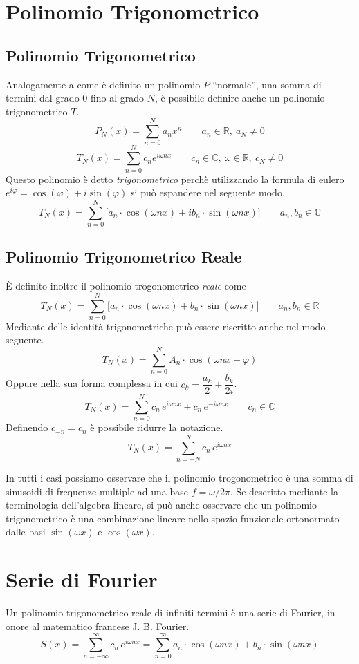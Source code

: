 \section{Polinomio Trigonometrico}
\subsection{Polinomio Trigonometrico}
Analogamente a come \`e definito un polinomio \(P\) ``normale'', una somma di
termini dal grado 0 fino al grado \(N\), \`e possibile definire anche un
polinomio trigonometrico \(T\).
\[
    P_N(x) = \sum_{n=0}^N a_n x^n \qquad a_n \in \mathbb{R},~ a_N \neq 0
\]
\[
    T_N(x) = \sum_{n=0}^N c_n e^{i\omega nx} 
        \qquad c_n \in\mathbb{C},~\omega\in\mathbb{R}, ~ c_N \neq 0
\]
Questo polinomio \`e detto \emph{trigonometrico} perch\`e utilizzando la
formula di eulero \(e^{i\varphi} = \cos(\varphi) + i\sin(\varphi)\) si pu\`o
espandere nel seguente modo.
\[
    T_N(x) = \sum_{n=0}^N\big [a_n\cdot\cos(\omega nx) + ib_n\cdot\sin(\omega nx)]
    \qquad a_n, b_n \in \mathbb{C}
\]

\subsection{Polinomio Trigonometrico Reale} \label{sec:real-trig}
\`E definito inoltre il polinomio trogonometrico \emph{reale} come
\[
    T_N(x) = \sum_{n=0}^N\big [a_n\cdot\cos(\omega nx) + b_n\cdot\sin(\omega nx)]
    \qquad a_n, b_n \in \mathbb{R}
\]
Mediante delle identit\`a trigonometriche pu\`o essere riscritto anche nel
modo seguente.
\[
    T_N(x) = \sum_{n=0}^N A_n\cdot\cos(\omega nx - \varphi)
\]
Oppure nella sua forma complessa in cui \(c_k = \dfrac{a_k}{2} + \dfrac{b_k}{2i}\).
\[
    T_N(x) = \sum_{n=0}^N c_n\,e^{i\omega nx} + \bar{c_n}\,e^{-i\omega nx}
    \qquad c_n \in \mathbb{C}
\]
Definendo \(c_{-n} = \bar{c_n}\) \`e possibile ridurre la notazione.
\[
    T_N(x) = \sum_{n=-N}^N c_n\,e^{i\omega nx}
\]

In tutti i casi possiamo osservare che il polinomio trogonometrico \`e una
somma di sinusoidi di frequenze multiple ad una base \(f = \omega/2\pi\).  Se
descritto mediante la terminologia dell'algebra lineare, si pu\`o anche
osservare che un polinomio trigonometrico \`e una combinazione lineare nello
spazio funzionale ortonormato dalle basi \(\sin(\omega x)\) e \(\cos(\omega
x)\).


\section{Serie di Fourier}
Un polinomio trigonometrico reale di infiniti termini \`e una serie di Fourier,
in onore al matematico francese  J. B. Fourier.
\[
	S(x) = \sum_{n=-\infty}^\infty c_n\,e^{i\omega nx} 
         = \sum_{n=0}^\infty a_n\cdot\cos(\omega nx) + b_n\cdot\sin(\omega nx)
\]

